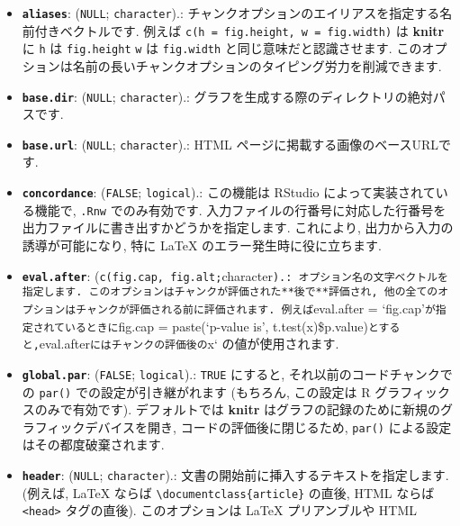 \documentclass[
]{bxjsreport}
\providecommand{\tightlist}{%
  \setlength{\itemsep}{0pt}\setlength{\parskip}{0pt}}
\begin{document}
\begin{itemize}
\tightlist
\item
  \textbf{\texttt{aliases}}: (\texttt{NULL}; \texttt{character}).:
  チャンクオプションのエイリアスを指定する名前付きベクトルです. 例えば
  \texttt{c(h\ =\ \textquotesingle{}fig.height\textquotesingle{},\ w\ =\ \textquotesingle{}fig.width\textquotesingle{})}
  は \textbf{knitr} に \texttt{h} は \texttt{fig.height} \texttt{w} は
  \texttt{fig.width} と同じ意味だと認識させます.
  このオプションは名前の長いチャンクオプションのタイピング労力を削減できます.
\item
  \textbf{\texttt{base.dir}}: (\texttt{NULL}; \texttt{character}).:
  グラフを生成する際のディレクトリの絶対パスです.
\item
  \textbf{\texttt{base.url}}: (\texttt{NULL}; \texttt{character}).: HTML
  ページに掲載する画像のベースURLです.
\item
  \textbf{\texttt{concordance}}: (\texttt{FALSE}; \texttt{logical}).:
  この機能は RStudio によって実装されている機能で, \texttt{.Rnw}
  でのみ有効です.
  入力ファイルの行番号に対応した行番号を出力ファイルに書き出すかどうかを指定します.
  これにより, 出力から入力の誘導が可能になり, 特に LaTeX
  のエラー発生時に役に立ちます.
\item
  \textbf{\texttt{eval.after}}:
  (\texttt{c(\textquotesingle{}fig.cap\textquotesingle{},\ \textquotesingle{}fig.alt\textquotesingle{};}character\texttt{).:\ オプション名の文字ベクトルを指定します.\ このオプションはチャンクが評価された**後で**評価され,\ 他の全てのオプションはチャンクが評価される前に評価されます.\ 例えば}eval.after
  = `fig.cap'\texttt{が指定されているときに}fig.cap = paste(`p-value
  is',
  t.test(x)\$p.value)\texttt{とすると,}eval.after\texttt{にはチャンクの評価後の}x`
  の値が使用されます.
\item
  \textbf{\texttt{global.par}}: (\texttt{FALSE}; \texttt{logical}).:
  \texttt{TRUE} にすると, それ以前のコードチャンクでの \texttt{par()}
  での設定が引き継がれます (もちろん, この設定は R
  グラフィックスのみで有効です). デフォルトでは \textbf{knitr}
  はグラフの記録のために新規のグラフィックデバイスを開き,
  コードの評価後に閉じるため, \texttt{par()}
  による設定はその都度破棄されます.
\item
  \textbf{\texttt{header}}: (\texttt{NULL}; \texttt{character}).:
  文書の開始前に挿入するテキストを指定します. (例えば, LaTeX ならば
  \texttt{\textbackslash{}documentclass\{article\}} の直後, HTML ならば
  \texttt{\textless{}head\textgreater{}} タグの直後). このオプションは
  LaTeX プリアンブルや HTML

\end{itemize}
\end{document}
